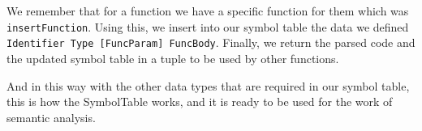 \documentclass{article}
\newcommand{\code}[1]{\colorbox{codebackground}{\texttt{#1}}}
\begin{document}
We remember that for a function we have a specific function for them which was \code{insertFunction}. Using this, we insert into our symbol table the data we defined \code{Identifier Type [FuncParam] FuncBody}. Finally, we return the parsed code and the updated symbol table in a tuple to be used by other functions.

And in this way with the other data types that are required in our symbol table, this is how the SymbolTable works, and it is ready to be used for the work of semantic analysis.
\end{document}
